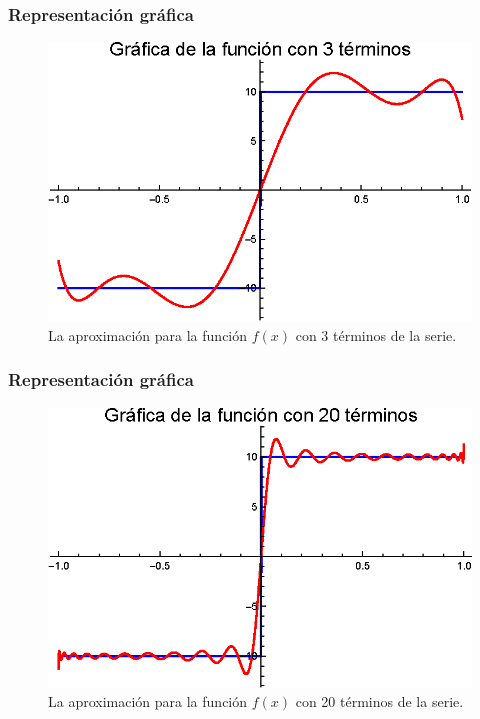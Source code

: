 \documentclass[12pt]{beamer}
\begin{document}
\begin{frame}
\frametitle{Representación gráfica}
\begin{figure}[H]
    \centering
    \includegraphics[scale=1]{Imagenes/Expansion_Legendre_V_03.eps}
    \caption{La aproximación para la función $f (x)$ con 3 términos de la serie.}
    \label{fig:figura_plot_01}
\end{figure}
\end{frame}
\begin{frame}
\frametitle{Representación gráfica}
\begin{figure}[H]
    \centering
    \includegraphics[scale=1]{Imagenes/Expansion_Legendre_V_20.eps}
    \caption{La aproximación para la función $f (x)$ con 20 términos de la serie.}
    \label{fig:figura_plot_02}
\end{figure}
\end{frame}
\end{document}
